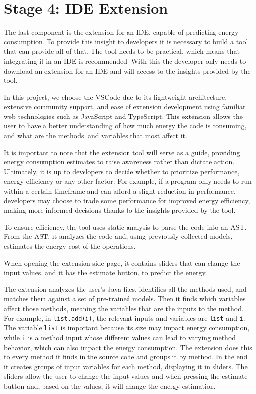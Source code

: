 \section{Stage 4: IDE Extension} \label{sec:work_stage4_extension_build}

{\color{blue}The last component is the extension for an IDE, capable of predicting energy consumption. 
To provide this insight to developers it is necessary to build a tool that can provide all of that. The tool needs to be practical, which means that integrating it in an IDE is recommended. With this the developer only needs to download an extension for an IDE and will access to the insights provided by the tool.

In this project, we choose the VSCode due to its lightweight architecture, extensive community support, and ease of extension development using familiar web technologies such as JavaScript and TypeScript. This extension allows the user to have a better understanding of how much energy the code is consuming, and what are the methods, and variables that most affect it.

It is important to note that the extension tool will serve as a guide, providing energy consumption estimates to raise awareness rather than dictate action. Ultimately, it is up to developers to decide whether to prioritize performance, energy efficiency or any other factor. For example, if a program only needs to run within a certain timeframe and can afford a slight reduction in performance, developers may choose to trade some performance for improved energy efficiency, making more informed decisions thanks to the insights provided by the tool.

To ensure efficiency, the tool uses static analysis to parse the code into an AST. From the AST, it analyzes the code and, using previously collected models, estimates the energy cost of the operations.}


When opening the extension side page, it contains sliders that can change the input values, and it has the estimate button, to predict the energy.

The extension analyzes the user's Java files, identifies all the methods used, and matches them against a set of pre-trained models. Then it finds which variables affect those methods, meaning the variables that are the inputs to the method. For example, in \texttt{list.add(i)}, the relevant inputs and variables are \texttt{list} and \texttt{i}. The variable \texttt{list} is important because its size may impact energy consumption, while \texttt{i} is a method input whose different values can lead to varying method behavior, which can also impact the energy consumption.
The extension does this to every method it finds in the source code and groups it by method. In the end it creates groups of input variables for each method, displaying it in sliders. The sliders allow the user to change the input values and when pressing the estimate button and, based on the values, it will change the energy estimation.

